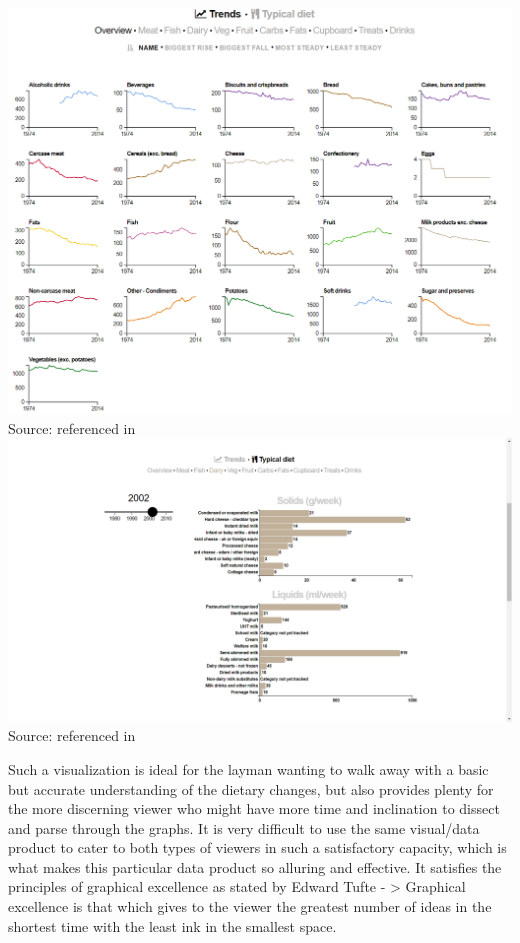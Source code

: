 \documentclass[]{book}
\theoremstyle{definition}
\theoremstyle{definition}
\theoremstyle{definition}
\theoremstyle{remark}
\begin{document}
\includegraphics{images/britain-diet-data-trends.PNG} Source:
\citep{britain-diet-data-trends} referenced in \citep{britain_diet_2016}
\includegraphics{images/britain-diet-data-typical_diet.png} Source:
\citep{britain-diet-data-typical_diet} referenced in
\citep{britain_diet_2016}

Such a visualization is ideal for the layman wanting to walk away with a
basic but accurate understanding of the dietary changes, but also
provides plenty for the more discerning viewer who might have more time
and inclination to dissect and parse through the graphs. It is very
difficult to use the same visual/data product to cater to both types of
viewers in such a satisfactory capacity, which is what makes this
particular data product so alluring and effective. It satisfies the
principles of graphical excellence as stated by Edward Tufte
\citep{visual_display} - \textgreater{} Graphical excellence is that
which gives to the viewer the greatest number of ideas in the shortest
time with the least ink in the smallest space.
\end{document}
